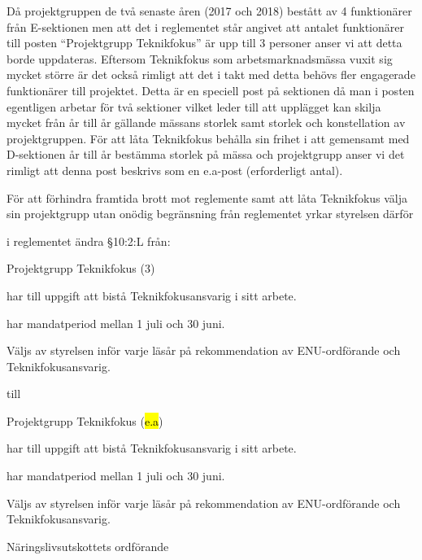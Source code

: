 \documentclass[../_main/handlingar.tex]{subfiles}
\begin{document}

Då projektgruppen de två senaste åren (2017 och 2018) bestått av 4 funktionärer från E-sektionen men att det i reglementet står angivet att antalet funktionärer till posten “Projektgrupp Teknikfokus” är upp till 3 personer anser vi att detta borde uppdateras. Eftersom Teknikfokus som arbetsmarknadsmässa vuxit sig mycket större är det också rimligt att det i takt med detta behövs fler engagerade funktionärer till projektet. Detta är en speciell post på sektionen då man i posten egentligen arbetar för två sektioner vilket leder till att upplägget kan skilja mycket från år till år gällande mässans storlek samt storlek och konstellation av projektgruppen. För att låta Teknikfokus behålla sin frihet i att gemensamt med D-sektionen år till år bestämma storlek på mässa och projektgrupp anser vi det rimligt att denna post beskrivs som en e.a-post (erforderligt antal).

För att förhindra framtida brott mot reglemente samt att låta Teknikfokus välja sin projektgrupp utan onödig begränsning från reglementet yrkar styrelsen därför

\begin{attsatser}
  \att i reglementet ändra \S10:2:L från:\par
  \begin{emptylist}
    \item Projektgrupp Teknikfokus (3)
      \begin{dashlist}
        \item har till uppgift att bistå Teknikfokusansvarig i sitt arbete.
        \item har mandatperiod mellan 1 juli och 30 juni.
        \item Väljs av styrelsen inför varje läsår på rekommendation av ENU-ordförande och Teknikfokusansvarig. 
      \end{dashlist}
    \end{emptylist}
    
    till 
    
    \begin{emptylist}
    \item Projektgrupp Teknikfokus (\hl{e.a})
      \begin{dashlist}
        \item har till uppgift att bistå Teknikfokusansvarig i sitt arbete.
        \item har mandatperiod mellan 1 juli och 30 juni.
        \item Väljs av styrelsen inför varje läsår på rekommendation av ENU-ordförande och Teknikfokusansvarig. 
      \end{dashlist}
    \end{emptylist}
  \changenote
\end{attsatser}

\begin{signatures}{1}
    \ist
    \signature{\enuordf}{Näringslivsutskottets ordförande}
\end{signatures}
\end{document}
